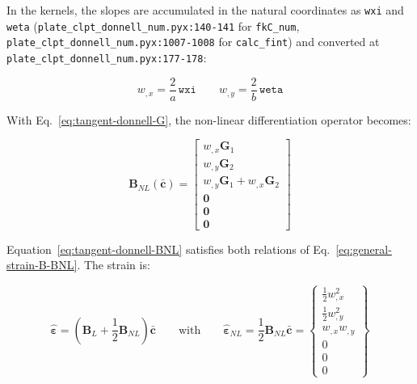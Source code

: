 In the kernels, the slopes are accumulated in the natural coordinates as \texttt{wxi} and \texttt{weta} (\texttt{plate\_clpt\_donnell\_num.pyx:140-141} for \texttt{fkC\_num}, \texttt{plate\_clpt\_donnell\_num.pyx:1007-1008} for \texttt{calc\_fint}) and converted at \texttt{plate\_clpt\_donnell\_num.pyx:177-178}:

\begin{equation*}
	w_{,x} = \frac{2}{a}\,\texttt{wxi} \qquad w_{,y} = \frac{2}{b}\,\texttt{weta}
\end{equation*}

With Eq.~\ref{eq:tangent-donnell-G}, the non-linear differentiation operator becomes:

\begin{equation}\label{eq:tangent-donnell-BNL}
	\boldsymbol{B}_{NL}(\bar{\boldsymbol{c}}) = \begin{bmatrix}
		w_{,x} \boldsymbol{G}_1 \\
		w_{,y} \boldsymbol{G}_2 \\
		w_{,y} \boldsymbol{G}_1 + w_{,x} \boldsymbol{G}_2 \\
		\boldsymbol{0} \\ \boldsymbol{0} \\ \boldsymbol{0}
	\end{bmatrix}
\end{equation}

Equation~\ref{eq:tangent-donnell-BNL} satisfies both relations of Eq.~\ref{eq:general-strain-B-BNL}. The strain is:

\begin{equation}\label{eq:tangent-donnell-strain-BNL}
	\hat{\boldsymbol{\varepsilon}} = \left( \boldsymbol{B}_L + \frac{1}{2}\boldsymbol{B}_{NL} \right) \bar{\boldsymbol{c}}
	\qquad \text{with} \qquad
	\hat{\boldsymbol{\varepsilon}}_{NL} = \frac{1}{2}\boldsymbol{B}_{NL}\bar{\boldsymbol{c}} = \left\{ \begin{matrix}
		\frac{1}{2} w_{,x}^2 \\[2pt] \frac{1}{2} w_{,y}^2 \\[2pt] w_{,x} w_{,y} \\[2pt] 0 \\ 0 \\ 0
	\end{matrix} \right\}
\end{equation}

